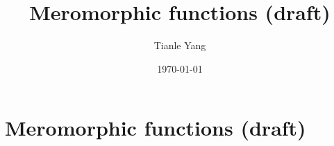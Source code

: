 \documentclass{noteformyself}
\title{Meromorphic functions (draft)}
\author{Tianle Yang}
\date{\today}
\begin{document}
    \maketitle
    \section{Meromorphic functions (draft)}




\end{document}
